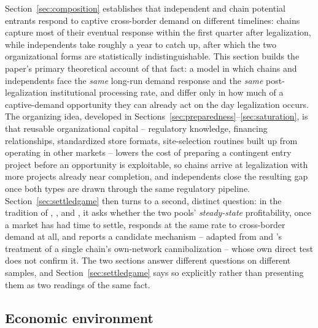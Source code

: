 \documentclass[english,12pt]{article}
\begin{document}
Section~\ref{sec:composition} establishes that independent and chain potential entrants respond to captive cross-border demand on different timelines: chains capture most of their eventual response within the first quarter after legalization, while independents take roughly a year to catch up, after which the two organizational forms are statistically indistinguishable. This section builds the paper's primary theoretical account of that fact: a model in which chains and independents face the \emph{same} long-run demand response and the \emph{same} post-legalization institutional processing rate, and differ only in how much of a captive-demand opportunity they can already act on the day legalization occurs. The organizing idea, developed in Sections~\ref{sec:preparedness}--\ref{sec:saturation}, is that reusable organizational capital -- regulatory knowledge, financing relationships, standardized store formats, site-selection routines built up from operating in other markets -- lowers the cost of preparing a contingent entry project before an opportunity is exploitable, so chains arrive at legalization with more projects already near completion, and independents close the resulting gap once both types are drawn through the same regulatory pipeline. Section~\ref{sec:settledgame} then turns to a second, distinct question: in the tradition of \citet{BresnahanReiss1991}, \citet{Mazzeo2002}, and \citet{Seim2006}, it asks whether the two pools' \emph{steady-state} profitability, once a market has had time to settle, responds at the same rate to cross-border demand at all, and reports a candidate mechanism -- adapted from \citet{Nishida2008} and \citet{Holmes2011}'s treatment of a single chain's own-network cannibalization -- whose own direct test does not confirm it. The two sections answer different questions on different samples, and Section~\ref{sec:settledgame} says so explicitly rather than presenting them as two readings of the same fact.

\subsection{Economic environment}
\label{sec:environment}
\end{document}
